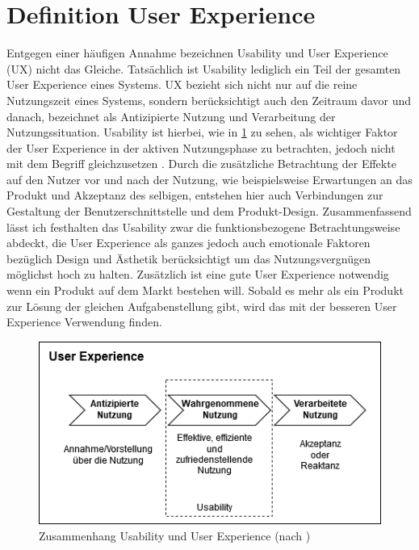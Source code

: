 \section{Definition User Experience}
Entgegen einer häufigen Annahme bezeichnen Usability und User Experience (UX) nicht das Gleiche.
Tatsächlich ist Usability lediglich ein Teil der gesamten User Experience eines Systems\cite{Knight.2019c}.
UX bezieht sich nicht nur auf die reine Nutzungszeit eines Systems, sondern berücksichtigt auch den Zeitraum davor und danach, bezeichnet als Antizipierte Nutzung und Verarbeitung der Nutzungssituation.
Usability ist hierbei, wie in \cref{fig:UX} zu sehen,  als wichtiger Faktor der User Experience in der aktiven Nutzungsphase zu betrachten, jedoch nicht mit dem Begriff gleichzusetzen \cite{Sarodnick.2016}.
Durch die zusätzliche Betrachtung der Effekte auf den Nutzer vor und nach der Nutzung, wie beispielsweise Erwartungen an das Produkt und Akzeptanz des selbigen, entstehen hier auch Verbindungen zur Gestaltung der Benutzerschnittstelle und dem Produkt-Design\cite{Richter.2016}.
Zusammenfassend lässt ich festhalten das Usability zwar die funktionsbezogene Betrachtungsweise abdeckt, die User Experience als ganzes jedoch auch emotionale Faktoren bezüglich Design und Ästhetik berücksichtigt um das Nutzungsvergnügen möglichst hoch zu halten.
Zusätzlich ist eine gute User Experience notwendig wenn ein Produkt auf dem Markt bestehen will.
Sobald es mehr als ein Produkt zur Lösung der gleichen Aufgabenstellung gibt, wird das mit der besseren User Experience Verwendung finden\cite{Knight.2019c}.

\begin{figure} [!h]
\begin{center}
  \includegraphics[scale=0.7]{figures/UX.png}
  \caption{Zusammenhang Usability und User Experience (nach \cite{Sarodnick.2016})}
  \label{fig:UX}
\end{center}
\end{figure}

